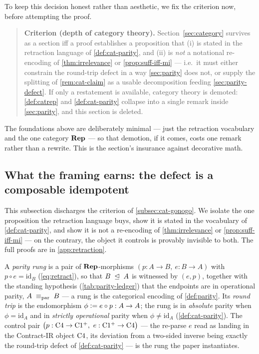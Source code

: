 To keep this decision honest rather than aesthetic, we fix the criterion now,
before attempting the proof.

\begin{quote}
\textbf{Criterion (depth of category theory).} Section~\ref{sec:category}
survives as a section iff a proof establishes a proposition that (i) is stated
in the retraction language of \cref{def:cat-parity}, and (ii) is \emph{not} a
notational re-encoding of \cref{thm:irrelevance} or
\cref{prop:suff-iff-mi} --- i.e.\ it must either constrain the round-trip
defect in a way \cref{sec:parity} does not, or supply the splitting of
\cref{rem:cat-claim} as a usable decomposition feeding \cref{sec:parity-defect}.
If only a restatement is available, category theory is demoted: \cref{def:catrep}
and \cref{def:cat-parity} collapse into a single remark inside
\cref{sec:parity}, and this section is deleted.
\end{quote}

\noindent The foundations above are deliberately minimal --- just the
retraction vocabulary and the one category $\mathbf{Rep}$ --- so that demotion, if
it comes, costs one remark rather than a rewrite. This is the section's
insurance against decorative math.

\subsection{What the framing earns: the defect is a composable idempotent}
\label{subsec:cat-theorem}

This subsection discharges the criterion of \cref{subsec:cat-gonogo}. We
isolate the one proposition the retraction language buys, show it is stated in
the vocabulary of \cref{def:cat-parity}, and show it is not a re-encoding of
\cref{thm:irrelevance} or \cref{prop:suff-iff-mi} --- on the contrary, the
object it controls is provably invisible to both. The full proofs are in
\cref{app:retraction}.

\begin{definition}
\label{def:parity-rung}
A \emph{parity rung} is a pair of $\mathbf{Rep}$-morphisms
$(p:A\to B,\ e:B\to A)$ with $p\circ e=\mathrm{id}_B$ (\cref{eq:retract}), so
that $B\;\trianglelefteq\; A$ is witnessed by $(e,p)$, together with the standing
hypothesis (\cref{tab:parity-ledger}) that the endpoints are in operational
parity, $A\;\equiv_{\mathrm{par}}\; B$ --- a rung is the categorical encoding of
\cref{def:parity}. Its \emph{round trip} is the endomorphism
$\phi\vcentcolon= e\circ p:A\to A$; the rung is in \emph{absolute} parity when
$\phi=\mathrm{id}_A$ and in \emph{strictly operational} parity when
$\phi\ne\mathrm{id}_A$ (\cref{def:cat-parity}). The control pair
$\big(p:\ladder{4}\to\ladderplus,\ e:\ladderplus\to\ladder{4}\big)$ --- the
re-parse $e$ read as landing in the Contract-IR object $\mathrm{C}4$, its
deviation from a two-sided inverse being exactly the round-trip defect of
\cref{def:cat-parity} --- is the rung the paper instantiates.
\end{definition}

